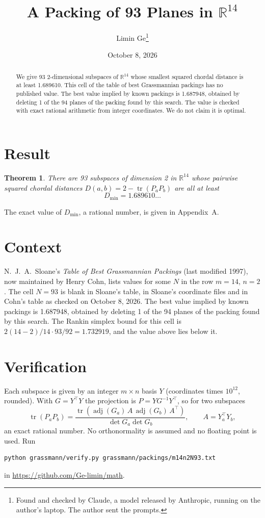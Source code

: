 \documentclass[11pt,a4paper]{article}
\title{A Packing of 93 Planes in $\mathbb{R}^{14}$}
\author{Limin Ge\thanks{Found and checked by Claude, a model released by Anthropic, running on the author's laptop. The author sent the prompts.}}
\date{October 8, 2026}
\newtheorem*{theorem}{Theorem}
\begin{document}
\maketitle
\begin{abstract}
We give 93 2-dimensional subspaces of $\mathbb{R}^{14}$ whose smallest squared chordal distance is at least 1.689610. This cell of the table of best Grassmannian packings has no published value. The best value implied by known packings is 1.687948, obtained by deleting 1 of the 94 planes of the packing found by this search. The value is checked with exact rational arithmetic from integer coordinates. We do not claim it is optimal.
\end{abstract}

\section{Result}
\begin{theorem}
There are 93 subspaces of dimension 2 in $\mathbb{R}^{14}$ whose pairwise squared chordal distances $D(a,b) = 2 - \operatorname{tr}(P_aP_b)$ are all at least
\[ D_{\min} = 1.689610\ldots \]
\end{theorem}
The exact value of $D_{\min}$, a rational number, is given in Appendix~A.


\section{Context}
N.~J.~A.~Sloane's \emph{Table of Best Grassmannian Packings} (last modified 1997), now maintained by Henry Cohn, lists values for some $N$ in the row $m=14$, $n=2$. The cell $N=93$ is blank in Sloane's table, in Sloane's coordinate files and in Cohn's table as checked on October 8, 2026. The best value implied by known packings is 1.687948, obtained by deleting 1 of the 94 planes of the packing found by this search. The Rankin simplex bound for this cell is $2(14-2)/14\cdot 93/92 = 1.732919$, and the value above lies below it.


\section{Verification}
Each subspace is given by an integer $m\times n$ basis $Y$ (coordinates times $10^{12}$, rounded). With $G=Y^\top Y$ the projection is $P=YG^{-1}Y^\top$, so for two subspaces
\[ \operatorname{tr}(P_aP_b)=\frac{\operatorname{tr}(\operatorname{adj}(G_a)\,A\,\operatorname{adj}(G_b)\,A^\top)}{\det G_a\det G_b},\qquad A=Y_a^\top Y_b, \]
an exact rational number. No orthonormality is assumed and no floating point is used. Run
\begin{verbatim}
python grassmann/verify.py grassmann/packings/m14n2N93.txt
\end{verbatim}
in \url{https://github.com/Ge-limin/math}.
\end{document}
